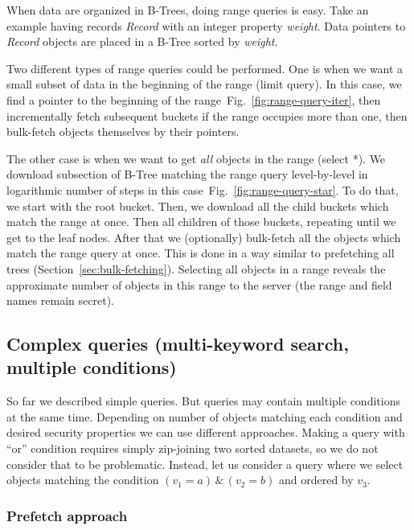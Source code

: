 \documentclass[notitlepage]{revtex4-1}
\newcommand{\figref}[1]{Fig.~\ref{#1}}
\begin{document}
When data are organized in B-Trees, doing range queries is easy.
Take an example having records \emph{Record} with an integer property \emph{weight}.
Data pointers to \emph{Record} objects are placed in a B-Tree sorted by \emph{weight}.

Two different types of range queries could be performed.
One is when we want a small subset of data in the beginning of the range (limit query).
In this case, we find a pointer to the beginning of the range~\figref{fig:range-query-iter}, then incrementally fetch subsequent buckets if the range occupies more than one, then bulk-fetch objects themselves by their pointers.

The other case is when we want to get \emph{all} objects in the range (select *).
We download subsection of B-Tree matching the range query level-by-level in logarithmic number of steps in this case~\figref{fig:range-query-star}.
To do that, we start with the root bucket.
Then, we download all the child buckets which match the range at once.
Then all children of those buckets, repeating until we get to the leaf nodes.
After that we (optionally) bulk-fetch all the objects which match the range query at once.
This is done in a way similar to prefetching all trees (Section~\ref{sec:bulk-fetching}).
Selecting all objects in a range reveals the approximate number of objects in this range to the server (the range and field names remain secret).

\subsection{Complex queries (multi-keyword search, multiple conditions)}

So far we described simple queries.
But queries may contain multiple conditions at the same time.
Depending on number of objects matching each condition and desired security properties we can use different approaches.
Making a query with ``or'' condition requires simply zip-joining two sorted datasets, so we do not consider that to be problematic.
Instead, let us consider a query where we select objects matching the condition $(v_1 = a) \,\&\, (v_2 = b)$ and ordered by $v_3$.

\subsubsection{Prefetch approach}
\label{sec:prefetch}
%
\end{document}
